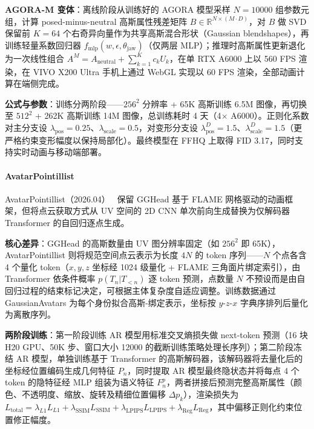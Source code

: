 \textbf{AGORA-M 变体}：离线阶段从训练好的 AGORA 模型采样 $N{=}10000$ 组参数元组，计算 posed-minus-neutral 高斯属性残差矩阵 $B \in \mathbb{R}^{N \times (M \cdot D)}$，对 $B$ 做 SVD 保留前 $K{=}64$ 个右奇异向量作为共享高斯混合形状（Gaussian blendshapes），再训练轻量系数回归器 $f_{\text{mlp}}(w, \epsilon, \theta_{\text{jaw}})$（仅两层 MLP）；推理时高斯属性更新退化为一次线性组合 $A^M = A_{\text{neutral}} + \sum_{k=1}^{K} c_k U_k$，在单 RTX A6000 上以 560 FPS 渲染，在 VIVO X200 Ultra 手机上通过 WebGL 实现以 60 FPS 渲染，全部动画计算在端侧完成。

\textbf{公式与参数}：训练分两阶段——$256^2$ 分辨率 + 65K 高斯训练 6.5M 图像，再切换至 $512^2$ + 262K 高斯训练 14M 图像，总训练耗时 4 天（4$\times$ A6000）。正则化系数对主分支设 $\lambda_{\text{pos}} = 0.25$、$\lambda_{\text{scale}} = 0.5$，对变形分支设 $\lambda^D_{\text{pos}} = 1.5$、$\lambda^D_{\text{scale}} = 1.5$（更严格约束变形幅度以保持局部化）。最终模型在 FFHQ 上取得 FID 3.17，同时支持实时动画与移动端部署。

\paragraph{AvatarPointillist}

AvatarPointillist（2026.04）~\cite{2604_04787} 保留 GGHead 基于 FLAME 网格驱动的动画框架，但将点云获取方式从 UV 空间的 2D CNN 单次前向生成替换为仅解码器 Transformer 的自回归逐点生成。

\textbf{核心差异}：GGHead 的高斯数量由 UV 图分辨率固定（如 $256^2$ 即 65K），AvatarPointillist 则将规范空间点云表示为长度 $4N$ 的 token 序列——$N$ 个点各含 4 个量化 token（$x, y, z$ 坐标经 1024 级量化 + FLAME 三角面片绑定索引），由 Transformer 依条件概率 $p(T_n | T_{<n})$ 逐 token 预测，点数量 $N$ 不预设而是由自回归过程的结束标记决定，可根据主体复杂度自适应调整。训练数据通过 GaussianAvatars 为每个身份拟合高斯-绑定表示，坐标按 $y$-$z$-$x$ 字典序排列后量化为离散序列。

\textbf{两阶段训练}：第一阶段训练 AR 模型用标准交叉熵损失做 next-token 预测（16 块 H20 GPU、50K 步、窗口大小 12000 的截断训练策略处理长序列）；第二阶段冻结 AR 模型，单独训练基于 Transformer 的高斯解码器，该解码器将去量化后的坐标经位置编码生成几何特征 $P_n$，同时提取 AR 模型最终隐状态并将每点 4 个 token 的隐特征经 MLP 组装为语义特征 $F_n^p$，两者拼接后预测完整高斯属性（颜色、不透明度、缩放、旋转及精细位置偏移 $\Delta p_k$），渲染损失为 $L_{\text{total}} = \lambda_{L1}L_{L1} + \lambda_{\text{SSIM}}L_{\text{SSIM}} + \lambda_{\text{LPIPS}}L_{\text{LPIPS}} + \lambda_{\text{Reg}}L_{\text{Reg}}$，其中偏移正则化约束位置修正幅度。

